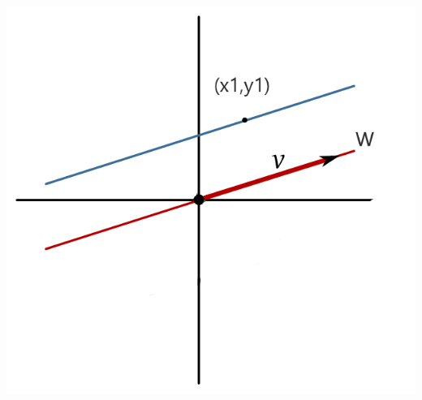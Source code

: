 \documentclass[10pt,a4paper,openright]{book}
\begin{document}
\begin{center}
\includegraphics[scale=0.45]{Sistema asociado}
\end{center}
\end{document}

